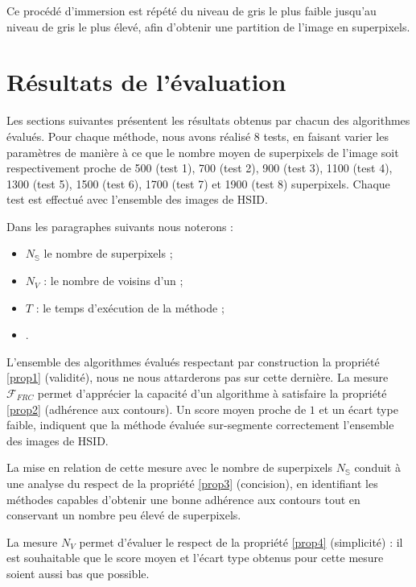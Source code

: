 Ce procédé d'immersion est répété du niveau de gris le plus faible jusqu'au niveau de gris le plus élevé, afin d'obtenir une partition de l'image en superpixels. 

\section{Résultats de l'évaluation}

Les sections suivantes présentent les résultats obtenus par chacun des algorithmes évalués. Pour chaque méthode, nous avons réalisé 8 tests, en faisant varier les paramètres de manière à ce que le nombre moyen de superpixels de l'image soit respectivement proche de 500 (test 1), 700 (test 2), 900 (test 3), 1100 (test 4), 1300 (test 5), 1500 (test 6), 1700 (test 7) et 1900 (test 8) superpixels. Chaque test est effectué avec l'ensemble des images de HSID. 

 Dans les paragraphes suivants nous noterons :
\begin{itemize}
\item $N_{\mathbb{S}}$ le nombre de superpixels ;
\item $N_{V}$ : le nombre de voisins d'un  ;
\item $T$ : le temps d'exécution de la méthode ;
\item {}.
\end{itemize}

L'ensemble des algorithmes évalués respectant par construction la propriété \ref{prop1} (validité), nous ne nous attarderons pas sur cette dernière. La mesure $\mathcal{F}_{FRC}$ permet d'apprécier la capacité d'un algorithme à satisfaire la propriété \ref{prop2} (adhérence aux contours). Un score moyen proche de $1$ et un écart type faible, indiquent que la méthode évaluée sur-segmente correctement l'ensemble des images de HSID. 

La mise en relation de cette mesure avec le nombre de superpixels $N_{\mathbb{S}}$ conduit à une analyse du respect de la propriété \ref{prop3} (concision), en identifiant les méthodes capables d'obtenir une bonne adhérence aux contours tout en conservant un nombre peu élevé de superpixels. 

La mesure $N_{V}$ permet d'évaluer le respect de la propriété \ref{prop4} (simplicité) : il est souhaitable que le score moyen et l'écart type obtenus pour cette mesure soient aussi bas que possible.

